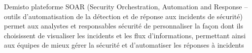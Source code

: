 Demisto plateforme SOAR (Security Orchestration, Automation and Response – outils d’automatisation de la détection et de réponse aux incidents de sécurité) permet aux analystes et responsables sécurité de personnaliser la façon dont ils choisissent de visualiser les incidents et les flux d’informations, permettant ainsi aux équipes de mieux gérer la sécurité et d’automatiser les réponses à incidents